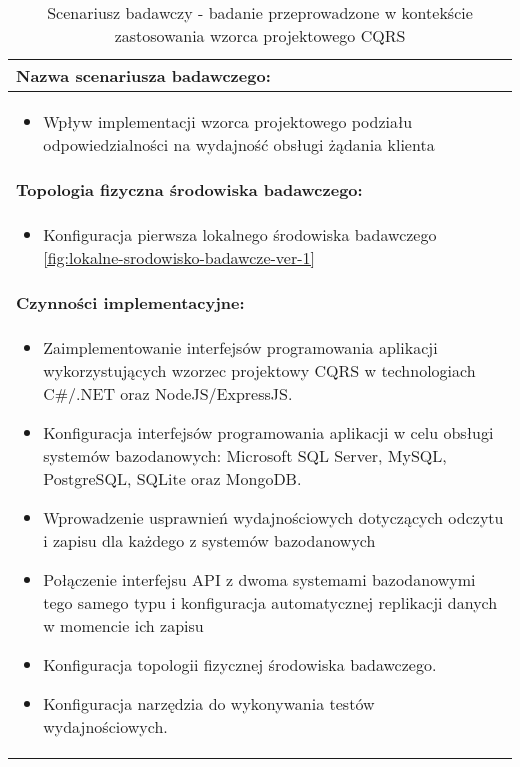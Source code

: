\setlength{\LTcapwidth}{\textwidth}
\setlength\LTleft{0pt}
\setlength\LTright{0pt}
\begin{longtable}[c]{|llll|}
    \caption{Scenariusz badawczy - badanie przeprowadzone w kontekście zastosowania wzorca projektowego CQRS}
    \label{tab:research-scenario-4}                                                  \\ \hline
    \multicolumn{4}{|l|}{\textbf{Nazwa scenariusza badawczego:}}                     \\ \hline
    \multicolumn{4}{|p{\linewidth}|}{
        \begin{itemize}[label={}]
            \item Wpływ implementacji wzorca projektowego podziału odpowiedzialności na wydajność obsługi żądania klienta
          \end{itemize}
    } \\ \hline
    \multicolumn{4}{|l|}{\textbf{Topologia fizyczna środowiska badawczego:}}         \\ \hline
    \multicolumn{4}{|p{\linewidth}|}{
        \begin{itemize}[label={}]
            \item Konfiguracja pierwsza lokalnego środowiska badawczego \ref{fig:lokalne-srodowisko-badawcze-ver-1}
          \end{itemize}
    }\\ \hline
    \multicolumn{4}{|l|}{\textbf{Czynności implementacyjne:}}                        \\ \hline
    \multicolumn{4}{|p{\linewidth}|}{
        \begin{itemize}
            \item Zaimplementowanie interfejsów programowania aplikacji wykorzystujących wzorzec projektowy CQRS w technologiach C\#/.NET oraz NodeJS/ExpressJS.
            \item Konfiguracja interfejsów programowania aplikacji w celu obsługi systemów bazodanowych: Microsoft SQL Server, MySQL, PostgreSQL, SQLite oraz MongoDB.
            \item Wprowadzenie usprawnień wydajnościowych dotyczących odczytu i zapisu dla każdego z systemów bazodanowych
            \item Połączenie interfejsu API z dwoma systemami bazodanowymi tego samego typu i konfiguracja automatycznej replikacji danych w momencie ich zapisu
            \item Konfiguracja topologii fizycznej środowiska badawczego.
            \item Konfiguracja narzędzia do wykonywania testów wydajnościowych.

\end{itemize}}
\end{longtable}
